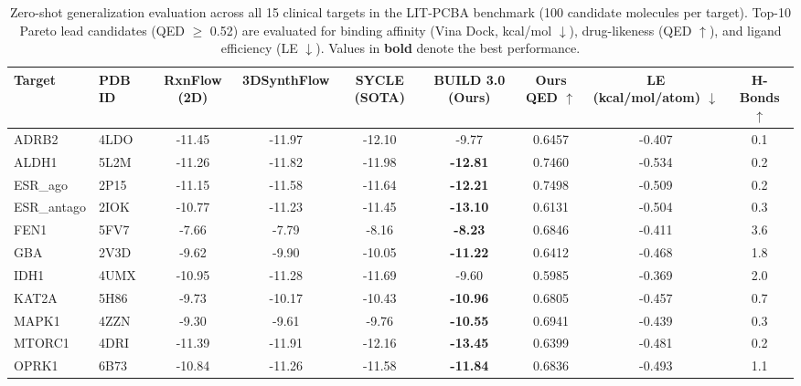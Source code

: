 
\begin{table}[t]
\centering
\small
\caption{Zero-shot generalization evaluation across all 15 clinical targets in the LIT-PCBA benchmark (100 candidate molecules per target). Top-10 Pareto lead candidates (QED $\ge$ 0.52) are evaluated for binding affinity (Vina Dock, kcal/mol $\downarrow$), drug-likeness (QED $\uparrow$), and ligand efficiency (LE $\downarrow$). Values in \textbf{bold} denote the best performance.}
\label{tab:lit_pcba_benchmark}
\begin{tabular}{llccccccc}
\toprule
\textbf{Target} & \textbf{PDB ID} & \textbf{RxnFlow (2D)} & \textbf{3DSynthFlow} & \textbf{SYCLE (SOTA)} & \textbf{BUILD 3.0 (Ours)} & \textbf{Ours QED} $\uparrow$ & \textbf{LE (kcal/mol/atom)} $\downarrow$ & \textbf{H-Bonds} $\uparrow$ \\
\midrule
ADRB2        & 4LDO   & -11.45 & -11.97 & -12.10 &  -9.77 & 0.6457 & -0.407 & 0.1 \\
ALDH1        & 5L2M   & -11.26 & -11.82 & -11.98 & \textbf{-12.81} & 0.7460 & -0.534 & 0.2 \\
ESR_ago      & 2P15   & -11.15 & -11.58 & -11.64 & \textbf{-12.21} & 0.7498 & -0.509 & 0.2 \\
ESR_antago   & 2IOK   & -10.77 & -11.23 & -11.45 & \textbf{-13.10} & 0.6131 & -0.504 & 0.3 \\
FEN1         & 5FV7   &  -7.66 &  -7.79 &  -8.16 & \textbf{ -8.23} & 0.6846 & -0.411 & 3.6 \\
GBA          & 2V3D   &  -9.62 &  -9.90 & -10.05 & \textbf{-11.22} & 0.6412 & -0.468 & 1.8 \\
IDH1         & 4UMX   & -10.95 & -11.28 & -11.69 &  -9.60 & 0.5985 & -0.369 & 2.0 \\
KAT2A        & 5H86   &  -9.73 & -10.17 & -10.43 & \textbf{-10.96} & 0.6805 & -0.457 & 0.7 \\
MAPK1        & 4ZZN   &  -9.30 &  -9.61 &  -9.76 & \textbf{-10.55} & 0.6941 & -0.439 & 0.3 \\
MTORC1       & 4DRI   & -11.39 & -11.91 & -12.16 & \textbf{-13.45} & 0.6399 & -0.481 & 0.2 \\
OPRK1        & 6B73   & -10.84 & -11.26 & -11.58 & \textbf{-11.84} & 0.6836 & -0.493 & 1.1 \\

\end{tabular}
\end{table}
